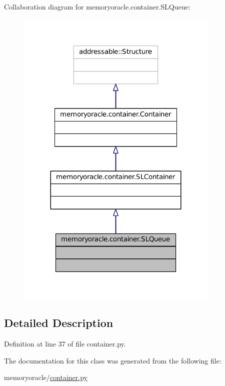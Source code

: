Collaboration diagram for memoryoracle.\+container.\+S\+L\+Queue\+:\nopagebreak
\begin{figure}[H]
\begin{center}
\leavevmode
\includegraphics[width=275pt]{classmemoryoracle_1_1container_1_1SLQueue__coll__graph}
\end{center}
\end{figure}


\subsection{Detailed Description}


Definition at line 37 of file container.\+py.



The documentation for this class was generated from the following file\+:\begin{DoxyCompactItemize}
\item 
memoryoracle/\hyperlink{container_8py}{container.\+py}\end{DoxyCompactItemize}
